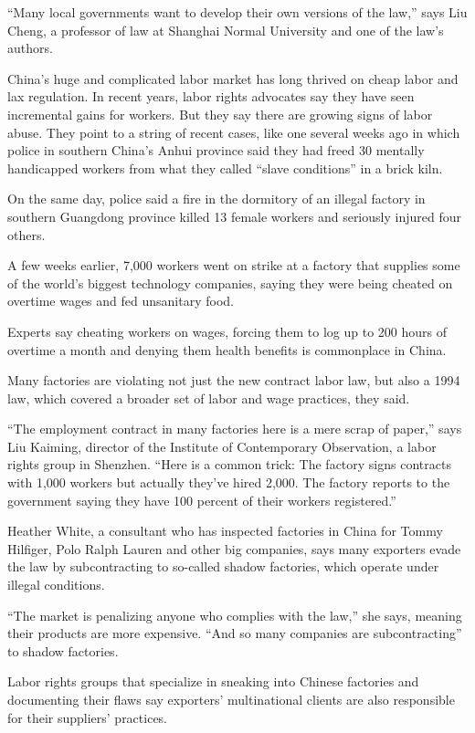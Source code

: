 ﻿\documentclass[12pt,a4paper,onecolumn]{article}
\begin{document}
``Many local governments want to develop their own versions of the law,'' says Liu Cheng, a
professor of law at Shanghai Normal University and one of the law's authors.

China's huge and complicated labor market has long thrived on cheap labor and lax regulation. In
recent years, labor rights advocates say they have seen incremental gains for workers. But they say
there are growing signs of labor abuse. They point to a string of recent cases, like one several
weeks ago in which police in southern China's Anhui province said they had freed 30 mentally
handicapped workers from what they called ``slave conditions'' in a brick kiln.

On the same day, police said a fire in the dormitory of an illegal factory in southern Guangdong
province killed 13 female workers and seriously injured four others.

A few weeks earlier, 7,000 workers went on strike at a factory that supplies some of the world's
biggest technology companies, saying they were being cheated on overtime wages and fed unsanitary
food.

Experts say cheating workers on wages, forcing them to log up to 200 hours of overtime a month and
denying them health benefits is commonplace in China.

Many factories are violating not just the new contract labor law, but also a 1994 law, which covered
a broader set of labor and wage practices, they said.

``The employment contract in many factories here is a mere scrap of paper,'' says Liu Kaiming,
director of the Institute of Contemporary Observation, a labor rights group in Shenzhen. ``Here is a
common trick: The factory signs contracts with 1,000 workers but actually they've hired 2,000. The
factory reports to the government saying they have 100 percent of their workers registered.''

Heather White, a consultant who has inspected factories in China for Tommy Hilfiger, Polo Ralph
Lauren and other big companies, says many exporters evade the law by subcontracting to so-called
shadow factories, which operate under illegal conditions.

``The market is penalizing anyone who complies with the law,'' she says, meaning their products are
more expensive. ``And so many companies are subcontracting'' to shadow factories.

Labor rights groups that specialize in sneaking into Chinese factories and documenting their flaws
say exporters' multinational clients are also responsible for their suppliers' practices.
\end{document}
